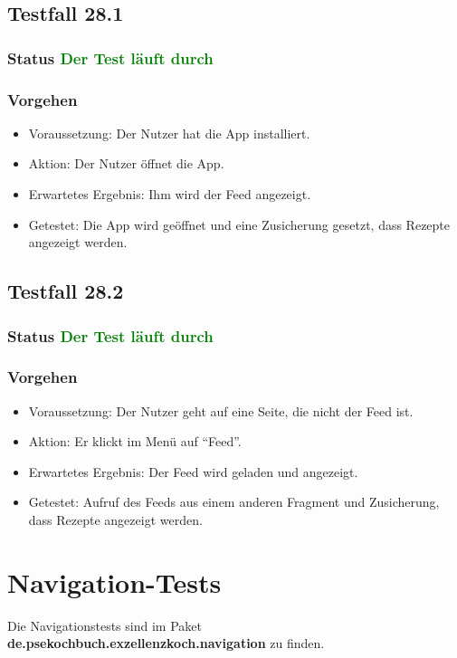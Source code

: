 \subsection{Testfall 28.1}
\subsubsection{Status \textcolor{green}{ Der Test läuft durch} }
\subsubsection{Vorgehen}
\begin{itemize}
\item Voraussetzung: Der Nutzer hat die App installiert.
\item Aktion: Der Nutzer öffnet die App.
\item Erwartetes Ergebnis: Ihm wird der Feed angezeigt.
\item Getestet: Die App wird geöffnet und eine Zusicherung gesetzt, dass Rezepte angezeigt werden.
\end{itemize}

\subsection{Testfall 28.2}
\subsubsection{Status \textcolor{green}{ Der Test läuft durch} }
\subsubsection{Vorgehen}
\begin{itemize}
\item Voraussetzung: Der Nutzer geht auf eine Seite, die nicht der Feed ist. 
\item Aktion: Er klickt im Menü auf "`Feed"'.
\item Erwartetes Ergebnis: Der Feed wird geladen und angezeigt.
\item Getestet: Aufruf des Feeds aus einem anderen Fragment und Zusicherung, dass Rezepte angezeigt werden. 
\end{itemize}

\section{Navigation-Tests}

Die Navigationstests sind im Paket \textbf{de.psekochbuch.exzellenzkoch.navigation} zu finden.

